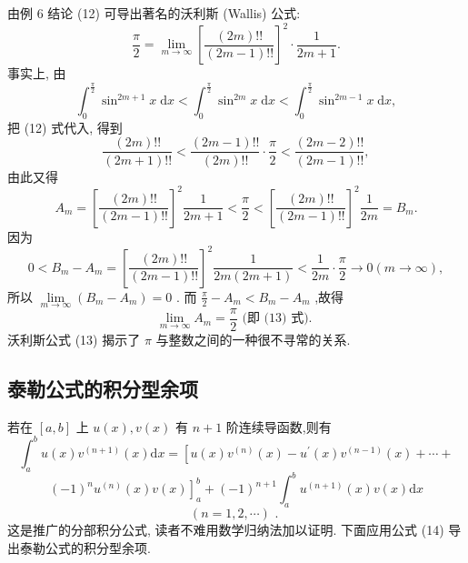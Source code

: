 由例 6 结论 (12) 可导出著名的沃利斯 (Wallis) 公式:
\[
\frac{\pi }{2} = \mathop{\lim }\limits_{{m \rightarrow  \infty }}{\left\lbrack  \frac{\left( {2m}\right) !!}{\left( {{2m} - 1}\right) !!}\right\rbrack  }^{2} \cdot  \frac{1}{{2m} + 1}. \tag{13}
\]
事实上, 由
\[
{\int }_{0}^{\frac{\pi }{2}}{\sin }^{{2m} + 1}x\mathrm{\;d}x < {\int }_{0}^{\frac{\pi }{2}}{\sin }^{2m}x\mathrm{\;d}x < {\int }_{0}^{\frac{\pi }{2}}{\sin }^{{2m} - 1}x\mathrm{\;d}x,
\]
把 (12) 式代入, 得到
\[
\frac{\left( {2m}\right) !!}{\left( {{2m} + 1}\right) !!} < \frac{\left( {{2m} - 1}\right) !!}{\left( {2m}\right) !!} \cdot  \frac{\pi }{2} < \frac{\left( {{2m} - 2}\right) !!}{\left( {{2m} - 1}\right) !!},
\]
由此又得
\[
{A}_{m} = {\left\lbrack  \frac{\left( {2m}\right) !!}{\left( {{2m} - 1}\right) !!}\right\rbrack  }^{2}\frac{1}{{2m} + 1} < \frac{\pi }{2} < {\left\lbrack  \frac{\left( {2m}\right) !!}{\left( {{2m} - 1}\right) !!}\right\rbrack  }^{2}\frac{1}{2m} = {B}_{m}.
\]
因为
\[
0 < {B}_{m} - {A}_{m} = {\left\lbrack  \frac{\left( {2m}\right) !!}{\left( {{2m} - 1}\right) !!}\right\rbrack  }^{2}\frac{1}{{2m}\left( {{2m} + 1}\right) } < \frac{1}{2m} \cdot  \frac{\pi }{2} \rightarrow  0\left( {m \rightarrow  \infty }\right) ,
\]
所以 \(\mathop{\lim }\limits_{{m \rightarrow  \infty }}\left( {{B}_{m} - {A}_{m}}\right)  = 0\) . 而 \(\frac{\pi }{2} - {A}_{m} < {B}_{m} - {A}_{m}\) ,故得
\[
\mathop{\lim }\limits_{{m \rightarrow  \infty }}{A}_{m} = \frac{\pi }{2}\text{ (即 (13) 式). }
\]
沃利斯公式 (13) 揭示了 \(\pi\) 与整数之间的一种很不寻常的关系.

\subsection{泰勒公式的积分型余项}

若在 \(\left\lbrack  {a,b}\right\rbrack\) 上 \(u\left( x\right) ,v\left( x\right)\) 有 \(n + 1\) 阶连续导函数,则有
\[
{\int }_{a}^{b}u\left( x\right) {v}^{\left( n + 1\right) }\left( x\right) \mathrm{d}x = \left\lbrack  {u\left( x\right) {v}^{\left( n\right) }\left( x\right)  - {u}^{\prime }\left( x\right) {v}^{\left( n - 1\right) }\left( x\right)  + \cdots  + }\right.
\]
\[
{\left. {\left( -1\right) }^{n}{u}^{\left( n\right) }\left( x\right) v\left( x\right) \right\rbrack  }_{a}^{b} + {\left( -1\right) }^{n + 1}{\int }_{a}^{b}{u}^{\left( n + 1\right) }\left( x\right) v\left( x\right) \mathrm{d}x
\]
\[
\left( {n = 1,2,\cdots }\right) \text{ . } \tag{14}
\]
这是推广的分部积分公式, 读者不难用数学归纳法加以证明. 下面应用公式 (14) 导出泰勒公式的积分型余项.


